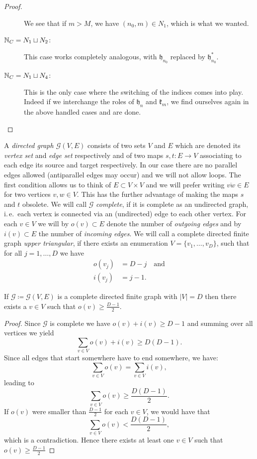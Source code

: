 \begin{proof}
\begin{description}
    We see that if \(m > M\), we have \((n_0, m) \in N_1\), which is what we wanted.
  \item[\(\mathbb{N}_C = N_1 \sqcup N_2\):] This case works completely analogous, with \(\mathfrak{h}_{n_0}\) replaced by \(\mathfrak{h}_{n_0}^\ast\).
  \item[\(\mathbb{N}_C = N_1 \sqcup N_4\):] This is the only case where the switching of the indices comes into play. Indeed if we interchange the roles of \(\mathfrak{h}_n\) and \(\mathfrak{k}_m\), we find ourselves again in the above handled cases and are done.
  \end{description}
\end{proof}

\begin{defin}
  A \emph{directed graph \(\mathcal{G}(V,E)\)} consists of two sets \(V\) and \(E\) which are denoted its \emph{vertex set} and \emph{edge set} respectively and of two maps \(s, t \colon E \to V\) associating to each edge its source and target respectively. In our case there are no parallel edges allowed (antiparallel edges may occur) and we will not allow loops. The first condition allows us to think of \(E \subset V \times V\) and we will prefer writing \(\overline{vw} \in E\) for two vertices \(v,w \in V\). This has the further advantage of making the maps \(s\) and \(t\) obsolete. We will call \(\mathcal{G}\) \emph{complete}, if it is complete as an undirected graph, i.\,e.\ each vertex is connected via an (undirected) edge to each other vertex. For each \(v \in V\) we will by \(o(v) \subset E\) denote the number of \emph{outgoing edges} and by \(i(v) \subset E\) the number of \emph{incoming edges}. We will call a complete directed finite graph \emph{upper triangular}, if there exists an enumeration \(V = \{v_1, \dots, v_D\}\), such that for all \(j = 1, \dots, D\) we have
  \begin{align*}
    o(v_j) & = D - j\quad \text{and}\\
    i(v_j) & = j - 1.
  \end{align*}
\end{defin}

\begin{lemma}[{\cite[Lemma~A.6]{MR3509968}}]
  If \(\mathcal{G} \coloneqq \mathcal{G}(V,E)\) is a complete directed finite graph with \(|V| = D\) then there exists a \(v \in V\) such that \(o(v) \geq \frac{D-1}{2}\).
\end{lemma}

\begin{proof}
  Since \(\mathcal{G}\) is complete we have \(o(v) + i(v) \geq D - 1\) and summing over all vertices we yield
  \[
    \sum_{v \in V} o(v) + i(v) \geq D(D-1).
  \]
  Since all edges that start somewhere have to end somewhere, we have:
  \[
    \sum_{v \in V} o(v) = \sum_{v \in V} i(v),
  \]
  leading to
  \[
    \sum_{v \in V} o(v) \geq \frac{D(D-1)}{2}.
  \]
  If \(o(v)\) were smaller than \(\frac{D-1}{2}\) for each \(v \in V\), we would have that
  \[
    \sum_{v \in V} o(v) < \frac{D(D-1)}{2},
  \]
  which is a contradiction. Hence there exists at least one \(v \in V\) such that \(o(v) \geq \frac{D-1}{2}\)
\end{proof}

